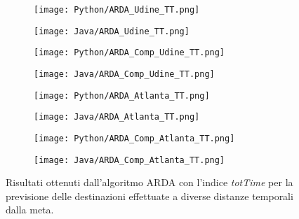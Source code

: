 \begin{figure}[!ht]
    \begin{center}
    \begin{subfigure}[a.1]{0.45\textwidth}
        \texttt{[image: Python/ARDA\_Udine\_TT.png]} \caption{}
    \end{subfigure}
    \begin{subfigure}[a.2]{0.45\textwidth}
        \texttt{[image: Java/ARDA\_Udine\_TT.png]} \caption{}
    \end{subfigure}
    \begin{subfigure}[b.1]{0.45\textwidth}
        \texttt{[image: Python/ARDA\_Comp\_Udine\_TT.png]} \caption{}
    \end{subfigure}
    \begin{subfigure}[b.2]{0.45\textwidth}
        \texttt{[image: Java/ARDA\_Comp\_Udine\_TT.png]} \caption{}
    \end{subfigure}
    \begin{subfigure}[c.1]{0.45\textwidth}
        \texttt{[image: Python/ARDA\_Atlanta\_TT.png]} \caption{}
    \end{subfigure}
    \vspace{0.5cm}
    \begin{subfigure}[c.2]{0.45\textwidth}
        \texttt{[image: Java/ARDA\_Atlanta\_TT.png]} \caption{}
    \end{subfigure}
    \begin{subfigure}[d.1]{0.45\textwidth}
        \texttt{[image: Python/ARDA\_Comp\_Atlanta\_TT.png]} \caption{}
    \end{subfigure}
    \begin{subfigure}[d.2]{0.45\textwidth}
        \texttt{[image: Java/ARDA\_Comp\_Atlanta\_TT.png]} \caption{}
    \end{subfigure}
    \caption[ARDA_1_TT]{
    Risultati ottenuti dall'algoritmo ARDA con l'indice \textit{totTime} per la
    previsione delle destinazioni effettuate a diverse distanze temporali dalla meta.
    }
    \label{etichetta}
    \end{center}
\end{figure}

